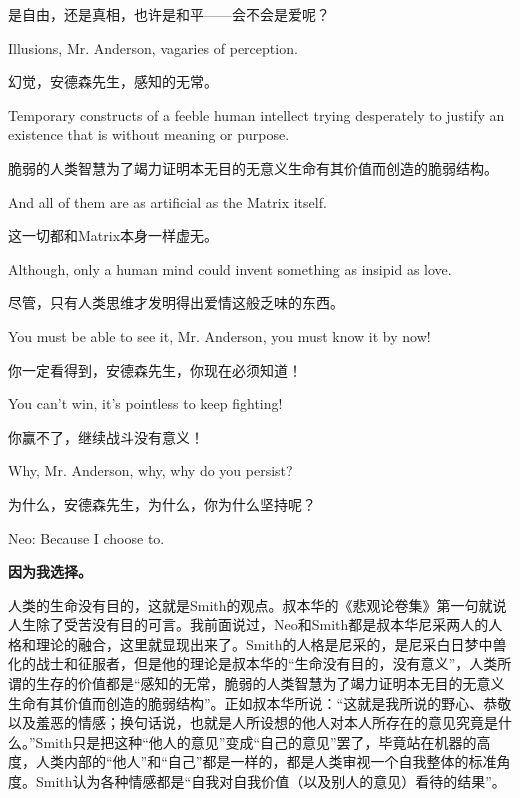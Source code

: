 \documentclass[UTF8]{ctexart}
\newenvironment{myquote}{\color{green} \setlength{\leftskip}{6em} \setlength{\rightskip}{4em} \setlength{\parindent}{-2em}}{\par}
\begin{document}
是自由，还是真相，也许是和平——会不会是爱呢？

\begin{myquote}
Illusions, Mr. Anderson, vagaries of perception.
\end{myquote}

幻觉，安德森先生，感知的无常。

\begin{myquote}
Temporary constructs of a feeble human intellect trying desperately to justify an existence that is without meaning or purpose.
\end{myquote}

脆弱的人类智慧为了竭力证明本无目的无意义生命有其价值而创造的脆弱结构。

\begin{myquote}
And all of them are as artificial as the Matrix itself.
\end{myquote}

这一切都和Matrix本身一样虚无。

\begin{myquote}
Although, only a human mind could invent something as insipid as love.
\end{myquote}

尽管，只有人类思维才发明得出爱情这般乏味的东西。

\begin{myquote}
You must be able to see it, Mr. Anderson, you must know it by now!
\end{myquote}

你一定看得到，安德森先生，你现在必须知道！

\begin{myquote}
You can't win, it's pointless to keep fighting!
\end{myquote}

你赢不了，继续战斗没有意义！

\begin{myquote}
Why, Mr. Anderson, why, why do you persist?
\end{myquote}

为什么，安德森先生，为什么，你为什么坚持呢？

\begin{myquote}
Neo: Because I choose to.
\end{myquote}

{\bf 因为我选择。}

人类的生命没有目的，这就是Smith的观点。叔本华的《悲观论卷集》第一句就说人生除了受苦没有目的可言。我前面说过，Neo和Smith都是叔本华尼采两人的人格和理论的融合，这里就显现出来了。Smith的人格是尼采的，是尼采白日梦中兽化的战士和征服者，但是他的理论是叔本华的“生命没有目的，没有意义”，人类所谓的生存的价值都是“感知的无常，脆弱的人类智慧为了竭力证明本无目的无意义生命有其价值而创造的脆弱结构”。正如叔本华所说：“这就是我所说的野心、恭敬以及羞恶的情感；换句话说，也就是人所设想的他人对本人所存在的意见究竟是什么。”Smith只是把这种“他人的意见”变成“自己的意见”罢了，毕竟站在机器的高度，人类内部的“他人”和“自己”都是一样的，都是人类审视一个自我整体的标准角度。Smith认为各种情感都是“自我对自我价值（以及别人的意见）看待的结果”。
\end{document}
